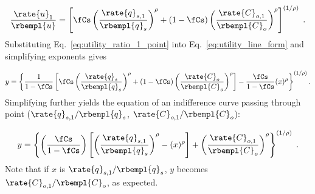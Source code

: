 \begin{equation} \label{eq:utility_ratio_1_point}
  \frac{\rate{u}_1}{\rbempl{u}} =
        \left[ \fCs \left( \frac{\rate{q}_{s,1}}{\rbempl{q}_s} \right)^\rho
        + (1-\fCs) \left( \frac{\rate{C}_{o,1}}{\rbempl{C}_o} \right)^\rho  \right]^{(1/\rho)} \; .
\end{equation}
%
Substituting Eq.~\ref{eq:utility_ratio_1_point} into Eq.~\ref{eq:utility_line_form} 
and simplifying exponents gives

\begin{equation}
  y = \left\{ \frac{1}{1 - \fCs} \left[ \fCs \left( \frac{\rate{q}_s}{\rbempl{q}_s} \right)^\rho 
        + (1-\fCs) \left( \frac{\rate{C}_o}{\rbempl{C}_o} \right)^\rho   \right] 
            - \frac{\fCs}{1 - \fCs} (x)^\rho \right\}^{(1/\rho)}  .
\end{equation}
%
Simplifying further yields
the equation of an indifference curve passing through point 
($\rate{q}_{s,1}/\rbempl{q}_s$, $\rate{C}_{o,1}/\rbempl{C}_o$):

\begin{equation} \label{eq:indiff_curve_eqn}
  y = \left\{ \left( \frac{\fCs}{1 - \fCs} \right) \left[ \left( \frac{\rate{q}_{s,1}}{\rbempl{q}_s} \right)^\rho 
                                                          - (x)^\rho  \right]
        + \left( \frac{\rate{C}_{o,1}}{\rbempl{C}_{o}} \right)^\rho \right\}^{(1/\rho)} \; .
\end{equation}
%
Note that if $x$ is $\rate{q}_{s,1}/\rbempl{q}_s$,
$y$ becomes $\rate{C}_{o,1}/\rbempl{C}_o$,
as expected.
